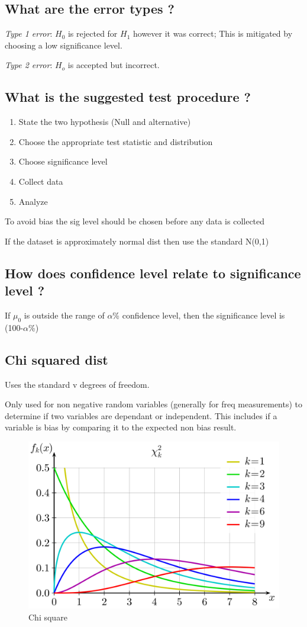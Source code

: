 \documentclass[11pt]{scrartcl} %
\begin{document}
\subsection{What are the error types
?}

\emph{Type 1 error}: \(H_0\) is rejected for \(H_1\) however it was
correct; This is mitigated by choosing a low significance level.

\emph{Type 2 error}: \(H_o\) is accepted but incorrect.

\subsection{What is the suggested test procedure
?}

\begin{enumerate}
\item State the two hypothesis (Null and alternative)
\item Choose the appropriate test statistic and distribution
\item Choose significance level
\item Collect data
\item Analyze
\end{enumerate}

To avoid bias the sig level should be chosen before any data is
collected

If the dataset is approximately normal dist then use the standard N(0,1)

\subsection{How does confidence level relate to significance level
?}

If \(\mu_0\) is outside the range of \(\alpha\)\% confidence level, then
the significance level is (100-\(\alpha\)\%)

\subsection{Chi squared dist}

Uses the standard v degrees of freedom.

Only used for non negative random variables (generally for freq
measurements) to determine if two variables are dependant or
independent. This includes if a variable is bias by comparing it to the
expected non bias result.

\begin{figure}[h] %
	\centering
	\includegraphics[width=0.5\columnwidth]{Chi-square_pdf.png} %
	\caption{Chi square}
\end{figure}
\end{document}
